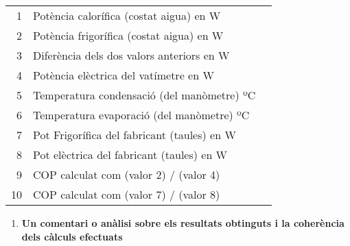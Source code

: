 \documentclass[a4paper]{article}
\begin{document}
\begin{table}[H]
	\centering
	\begin{tabular}{rl|r}
		1 & Potència calorífica (costat aigua) en W & \\
		2 & Potència frigorífica (costat aigua) en W & \\
		3 & Diferència dels dos valors anteriors en W & \\
		4 & Potència elèctrica del vatímetre en W & \\
		5 & Temperatura condensació (del manòmetre) ºC & \\
		6 & Temperatura evaporació (del manòmetre) ºC & \\
		7 & Pot Frigorífica del fabricant (taules) en W & \\
		8 & Pot elèctrica del fabricant (taules) en W & \\
		9 & COP calculat com (valor 2) / (valor 4) & \\
		10 & COP calculat com (valor 7) / (valor 8) & \\
	\end{tabular}
\end{table}

\begin{enumerate}[resume]
	\item \textbf{Un comentari o anàlisi sobre els resultats obtinguts i la coherència dels càlculs efectuats}
\end{enumerate}
\end{document}
